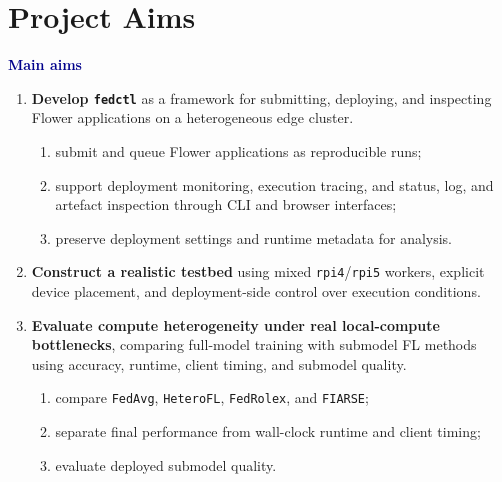 \section{Project Aims}
\label{sec:project_aims}

\begin{aimbox}
\textbf{\textcolor{darkblue}{Main aims}}

\begin{enumerate}[label=(\alph*), topsep=6pt, itemsep=6pt]
  \item \label{aim:a}\textbf{Develop \texttt{fedctl}} as a framework for submitting, deploying, and inspecting Flower applications on a heterogeneous edge cluster.
  \begin{enumerate}[label=(\arabic*), leftmargin=2.5em, topsep=2pt, itemsep=2pt]
    \item \label{aim:a.1}submit and queue Flower applications as reproducible runs;
    \item \label{aim:a.2}support deployment monitoring, execution tracing, and status, log, and artefact inspection through CLI and browser interfaces;
    \item \label{aim:a.3}preserve deployment settings and runtime metadata for analysis.
  \end{enumerate}
  \item \label{aim:b}\textbf{Construct a realistic testbed} using mixed \texttt{rpi4}/\texttt{rpi5} workers, explicit device placement, and deployment-side control over execution conditions.
  \item \label{aim:c}\textbf{Evaluate compute heterogeneity under real local-compute bottlenecks}, comparing full-model training with submodel FL methods using accuracy, runtime, client timing, and submodel quality.
  \begin{enumerate}[label=(\arabic*), leftmargin=2.5em, topsep=2pt, itemsep=2pt]
    \item \label{aim:c.1}compare \texttt{FedAvg}, \texttt{HeteroFL}, \texttt{FedRolex}, and \texttt{FIARSE};
    \item \label{aim:c.2}separate final performance from wall-clock runtime and client timing;
    \item \label{aim:c.3}evaluate deployed submodel quality.
  \end{enumerate}
\end{enumerate}
\end{aimbox}

